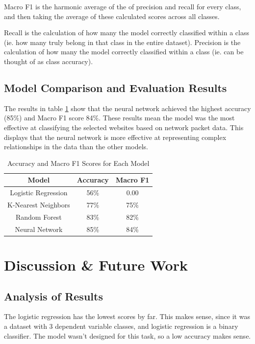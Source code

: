 \documentclass[10pt,sigconf,letterpaper,nonacm]{acmart}
\begin{document}
Macro F1 is the harmonic average of the of precision and recall for every class, and then taking the average of these calculated scores across all classes.

Recall is the calculation of how many the model correctly classified within a class (ie. how many truly belong in that class in the entire dataset). 
Precision is the calculation of how many the model correctly classified within a class (ie. can be thought of as class accuracy).


\subsection{Model Comparison and Evaluation Results}
The results in table \ref{tab:results} show that the neural network achieved the highest accuracy (85\%) and Macro F1 score 84\%. These results mean the model was the most effective at classifying the selected websites based on network packet data.
This displays that the neural network is more effective at representing complex relationships in the data than the other models. 

\begin{table}[!h]
  \begin{center}
  \caption{Accuracy and Macro F1 Scores for Each Model}
  \label{tab:results}
  \begin{tabular}{|c|c|c|}
    \hline
    Model & Accuracy & Macro F1 \\
    \hline
    Logistic Regression & 56\% & 0.00 \\
    K-Nearest Neighbors & 77\% & 75\% \\
    Random Forest & 83\% & 82\% \\
    Neural Network & 85\% & 84\% \\
    \hline
  \end{tabular}
  \end{center}
\end{table}


\section{Discussion \& Future Work}
\subsection{Analysis of Results}

The logistic regression has the lowest scores by far. This makes sense, since it was a dataset with 3 dependent variable classes, and logistic regression is a binary classifier. 
The model wasn't designed for this task, so a low accuracy makes sense.
\end{document}
